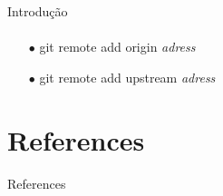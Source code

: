 \documentclass[xcolor=dvipsnames,t]{beamer}
\begin{document}
\begin{frame}{Introdução}
\framesubtitle{}
\vfill	

\begin{itemize}
	\item[$\bullet$] git remote add origin \textit{adress}
	\item[$\bullet$] git remote add upstream \textit{adress}	
\end{itemize}
%	
\end{frame}


\section{References}
\begin{frame}[allowframebreaks]{References}
	\tiny
%	
\end{frame}
\end{document}
